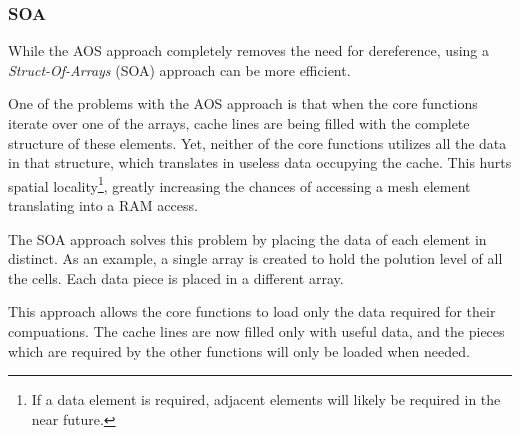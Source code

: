 	\subsubsection{SOA}

While the AOS approach completely removes the need for dereference, using a \textit{Struct-Of-Arrays} (SOA) approach can be more efficient.

One of the problems with the AOS approach is that when the core functions iterate over one of the arrays, cache lines are being filled with the complete structure of these elements. Yet, neither of the core functions utilizes all the data in that structure, which translates in useless data occupying the cache. This hurts spatial locality\footnote{If a data element is required, adjacent elements will likely be required in the near future.}, greatly increasing the chances of accessing a mesh element translating into a RAM access.

The SOA approach solves this problem by placing the data of each element in distinct. As an example, a single array is created to hold the polution level of all the cells. Each data piece is placed in a different array.

This approach allows the core functions to load only the data required for their compuations. The cache lines are now filled only with useful data, and the pieces which are required by the other functions will only be loaded when needed.
